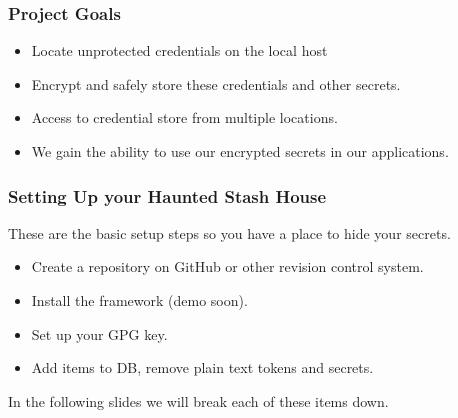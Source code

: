 \documentclass[aspectratio=169]{beamer}
\begin{document}
\begin{frame}
    \frametitle{Project Goals}
    \begin{itemize}
        \item Locate unprotected credentials on the local host
        \item Encrypt and safely store these credentials and other secrets.
        \item Access to credential store from multiple locations.
        \item We gain the ability to use our encrypted secrets in our applications.
    \end{itemize}


\end{frame}

\begin{frame}
    \frametitle{Setting Up your Haunted Stash House}
    These are the basic setup steps so you have a place to hide your secrets.
    \begin{itemize}
        \item Create a repository on GitHub or other revision control system.
        \item Install the framework (demo soon).
        \item Set up your GPG key.
        \item Add items to DB, remove plain text tokens and secrets.
    \end{itemize}
    In the following slides we will break each of these items down.
\end{frame}
\end{document}
